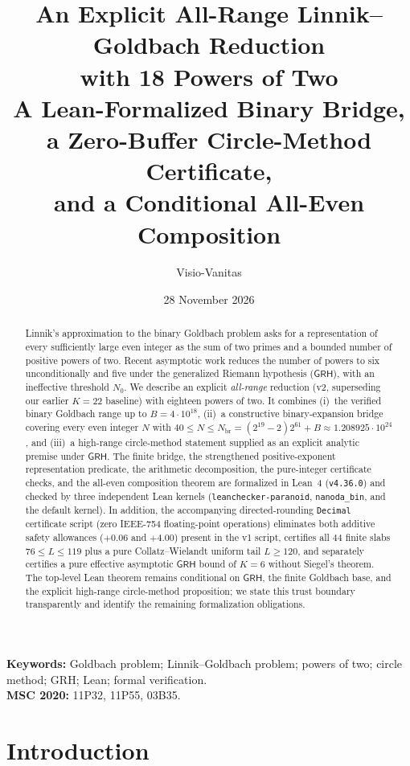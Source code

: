 \documentclass[11pt,a4paper]{article}
\title{\textbf{An Explicit All-Range Linnik--Goldbach Reduction\\with 18 Powers of Two}\\[0.35em]
\large A Lean-Formalized Binary Bridge, a Zero-Buffer Circle-Method Certificate,\\and a Conditional All-Even Composition}
\author{Visio-Vanitas}
\date{28 November 2026}
\newcommand{\GRH}{\mathsf{GRH}}
\begin{document}
\maketitle

\begin{abstract}
Linnik's approximation to the binary Goldbach problem asks for a representation of every sufficiently large even integer as the sum of two primes and a bounded number of positive powers of two. Recent asymptotic work reduces the number of powers to six unconditionally and five under the generalized Riemann hypothesis ($\GRH$), with an ineffective threshold $N_0$. We describe an explicit \emph{all-range} reduction (v2, superseding our earlier $K=22$ baseline) with eighteen powers of two. It combines (i)~the verified binary Goldbach range up to $B = 4\cdot 10^{18}$, (ii)~a constructive binary-expansion bridge covering every even integer $N$ with $40 \le N \le N_{\mathrm{br}} = (2^{19}-2)2^{61} + B \approx 1.208925\cdot 10^{24}$, and (iii)~a high-range circle-method statement supplied as an explicit analytic premise under $\GRH$. The finite bridge, the strengthened positive-exponent representation predicate, the arithmetic decomposition, the pure-integer certificate checks, and the all-even composition theorem are formalized in Lean~4 (\texttt{v4.36.0}) and checked by three independent Lean kernels (\texttt{leanchecker-paranoid}, \texttt{nanoda\_bin}, and the default kernel). In addition, the accompanying directed-rounding \texttt{Decimal} certificate script (zero IEEE-754 floating-point operations) eliminates both additive safety allowances ($+0.06$ and $+4.00$) present in the v1 script, certifies all $44$ finite slabs $76 \le L \le 119$ plus a pure Collatz--Wielandt uniform tail $L \ge 120$, and separately certifies a pure effective asymptotic $\GRH$ bound of $K=6$ without Siegel's theorem. The top-level Lean theorem remains conditional on $\GRH$, the finite Goldbach base, and the explicit high-range circle-method proposition; we state this trust boundary transparently and identify the remaining formalization obligations.
\end{abstract}

\noindent\textbf{Keywords:} Goldbach problem; Linnik--Goldbach problem; powers of two; circle method; GRH; Lean; formal verification.\\
\textbf{MSC 2020:} 11P32, 11P55, 03B35.

\section{Introduction}
\end{document}
